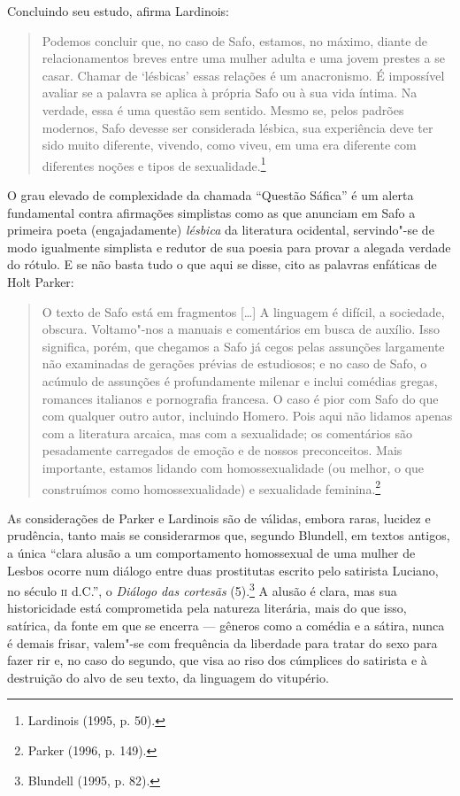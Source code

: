 Concluindo seu estudo, afirma Lardinois:

\begin{quote}
Podemos concluir que, no caso de Safo, estamos, no máximo, diante de
relacionamentos breves entre uma mulher adulta e uma jovem prestes a se casar.
Chamar de ‘lésbicas’ essas relações é um anacronismo. É impossível avaliar se a
palavra se aplica à própria Safo ou à sua vida íntima. Na verdade, essa é uma
questão sem sentido. Mesmo se, pelos padrões modernos, Safo devesse ser
considerada lésbica, sua experiência deve ter sido muito diferente, vivendo,
como viveu, em uma era diferente com diferentes noções e tipos de sexualidade.\footnote{ Lardinois (1995, p. 50).}
\end{quote}

O grau elevado de complexidade da chamada “Questão Sáfica” é um alerta
fundamental contra afirmações simplistas como as que anunciam em Safo a
primeira poeta (engajadamente) \textit{lésbica} da literatura ocidental,
servindo"-se de modo igualmente simplista e redutor de sua poesia para provar a alegada
verdade do rótulo. E se não basta tudo o que aqui se disse, cito as palavras
enfáticas de Holt Parker: 

\begin{quote}
O texto de Safo está em fragmentos [\ldots{}] A linguagem é difícil, a sociedade,
obscura. Voltamo"-nos a manuais e comentários em busca de auxílio. Isso
significa, porém, que chegamos a Safo já cegos pelas assunções largamente não
examinadas de gerações prévias de estudiosos; e no caso de Safo, o acúmulo de
assunções é profundamente milenar e inclui comédias gregas, romances italianos
e pornografia francesa. O caso é pior com Safo do que com qualquer outro autor,
incluindo Homero. Pois aqui não lidamos apenas com a literatura arcaica, mas
com a sexualidade; os comentários são pesadamente carregados de emoção e de
nossos preconceitos. Mais importante, estamos lidando com homossexualidade (ou
melhor, o que construímos como homossexualidade) e sexualidade feminina.\footnote{ Parker (1996, p. 149).}
\end{quote}

As considerações de Parker e Lardinois são de válidas, embora raras, lucidez e
prudência, tanto mais se considerarmos que, segundo Blundell, em
textos antigos, a única “clara alusão a um comportamento homossexual de uma
mulher de Lesbos ocorre num diálogo entre duas prostitutas escrito pelo
satirista Luciano, no século \textsc{ii} d.C.”, o \textit{Diálogo das cortesãs}
(5).\footnote{ Blundell (1995, p. 82).} A
alusão é clara, mas sua historicidade está comprometida pela natureza
literária, mais do que isso, satírica, da fonte em que se encerra --- gêneros como a
comédia e a sátira, nunca é demais frisar, valem"-se com frequência da liberdade
para tratar do sexo para fazer rir e, no caso do segundo, que visa ao riso dos
cúmplices do satirista e à destruição do alvo de seu texto, da linguagem do
vitupério. 

